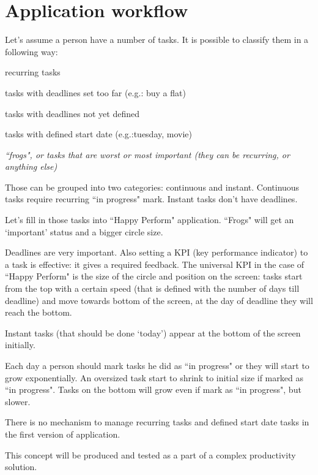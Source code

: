 \section{Application workflow}

Let's assume a person have a number of tasks. It is possible to classify them in a following way: 
\begin{compactenum}
\item recurring tasks
\item tasks with deadlines set too far (e.g.: buy a flat)
\item tasks with deadlines not yet defined
\item tasks with defined start date (e.g.:tuesday, movie)
\item \em ``frogs", or tasks that are worst or most important (they can be recurring, or anything else)
\end{compactenum}

Those can be grouped into two categories: continuous and instant. Continuous tasks require recurring ``in progress" mark. Instant tasks don't have deadlines.

Let's fill in those tasks into ``Happy Perform" application. ``Frogs" will get an `important' status and a bigger circle size.

Deadlines are very important. Also setting a KPI (key performance indicator) to a task is effective: it gives a required feedback. The universal KPI in the case of ``Happy Perform" is the size of the circle and position on the screen: tasks start from the top with a certain speed (that is defined with the number of days till deadline) and move towards bottom of the screen, at the day of deadline they will reach the bottom.

Instant tasks (that should be done `today') appear at the bottom of the screen initially.

Each day a person should mark tasks he did as ``in progress" or they will start to grow exponentially. An oversized task start to shrink to initial size if marked as ``in progress". Tasks on the bottom will grow even if mark as ``in progress", but slower.

There is no mechanism to manage recurring tasks and defined start date tasks in the first version of application.

This concept will be produced and tested as a part of a complex productivity solution.


